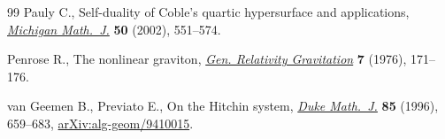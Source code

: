 \documentclass[pdftex]{sigma}
\numberwithin{equation}{section}
\begin{document}
\begin{thebibliography}{99}
Pauly C., Self-duality of {C}oble's quartic hypersurface and applications,
 \href{https://doi.org/10.1307/mmj/1039029982}{\textit{Michigan Math.~J.}} \textbf{50} (2002), 551--574.

Penrose R., The nonlinear graviton, \href{https://doi.org/10.1007/bf00763433}{\textit{Gen. Relativity Gravitation}}
 \textbf{7} (1976), 171--176.

van Geemen B., Previato E., On the {H}itchin system, \href{https://doi.org/10.1215/S0012-7094-96-08525-7}{\textit{Duke Math.~J.}}
 \textbf{85} (1996), 659--683, \href{https://arxiv.org/abs/alg-geom/9410015}{arXiv:alg-geom/9410015}.

\end{thebibliography}\LastPageEnding
\end{document}
